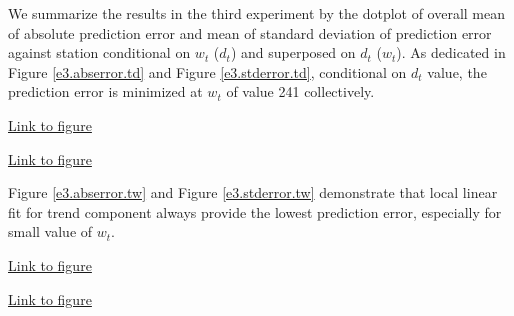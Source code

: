 We summarize the results in the third experiment by the dotplot of overall mean 
of absolute prediction error and mean of standard deviation of prediction error
against station conditional on $w_t$ ($d_t$) and superposed on $d_t$ ($w_t$). As
dedicated in Figure
\href{../plots/a1950/E3/tmax.mean.absmeans.error.td.pdf}{\ref*{e3.abserror.td}} 
and Figure 
\href{../plots/a1950/E3/tmax.mean.std.error.td.pdf}{\ref*{e3.stderror.td}}, 
conditional on $d_t$ value, the prediction error is minimized at $w_t$ of value 
241 collectively. 

\begin{framed}
\begin{center}
  \href{../plots/a1950/E3/tmax.mean.absmeans.error.td.pdf}{Link to figure}
  \label{e3.abserror.td}
\end{center}
\end{framed}

\begin{framed}
\begin{center}
  \href{../plots/a1950/E3/tmax.mean.std.error.td.pdf}{Link to figure}
  \label{e3.stderror.td}
\end{center}
\end{framed}

Figure 
\href{../plots/a1950/E3/tmax.mean.absmeans.error.tw.pdf}{\ref*{e3.abserror.tw}} 
and Figure 
\href{../plots/a1950/E3/tmax.mean.std.error.tw.pdf}{\ref*{e3.stderror.tw}}
demonstrate that local linear fit for trend component always provide the lowest
prediction error, especially for small value of $w_t$.

\begin{framed}
\begin{center}
  \href{../plots/a1950/E3/tmax.mean.absmeans.error.tw.pdf}{Link to figure}
  \label{e3.abserror.tw}
\end{center}
\end{framed}

\begin{framed}
\begin{center}
  \href{../plots/a1950/E3/tmax.mean.std.error.tw.pdf}{Link to figure}
  \label{e3.stderror.tw}
\end{center}
\end{framed}



